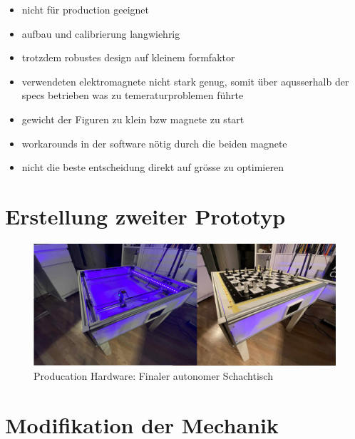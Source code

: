\begin{itemize}
\tightlist
\item
  nicht für production geeignet
\item
  aufbau und calibrierung langwiehrig
\item
  trotzdem robustes design auf kleinem formfaktor
\item
  verwendeten elektromagnete nicht stark genug, somit über aqusserhalb
  der specs betrieben was zu temeraturproblemen führte
\item
  gewicht der Figuren zu klein bzw magnete zu start
\item
  workarounds in der software nötig durch die beiden magnete
\item
  nicht die beste entscheidung direkt auf grösse zu optimieren
\end{itemize}

\hypertarget{erstellung-zweiter-prototyp}{%
\section{Erstellung zweiter
Prototyp}\label{erstellung-zweiter-prototyp}}

\begin{figure}
\centering
\includegraphics{images/table_images/prod.png}
\caption{Producation Hardware: Finaler autonomer Schachtisch}
\end{figure}

\hypertarget{modifikation-der-mechanik}{%
\section{Modifikation der Mechanik}\label{modifikation-der-mechanik}}

